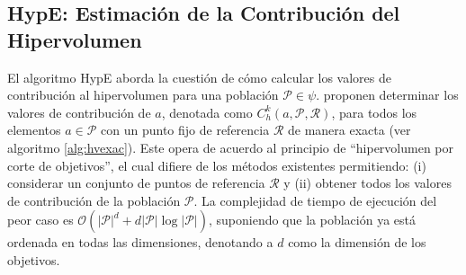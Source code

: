  \subsection{HypE: Estimaci\'on de la Contribuci\'on del Hipervolumen}

  El algoritmo HypE aborda la cuesti\'on de c\'omo calcular los valores de contribuci\'on al hipervolumen 
  para una poblaci\'on $\mathcal{P} \in \psi$.  \cite{Bader11} proponen determinar los valores de contribuci\'on
  de $a$, denotada como $C^k_h\left(a,\mathcal{P},\mathcal{R} \right)$, para todos los elementos \DIFdelbegin {}\DIFdelend $a \in \mathcal{P}$ con 
  un punto fijo de referencia $\mathcal{R}$ de manera exacta (ver algoritmo \ref{alg:hvexac}). Este opera de acuerdo al principio de ``hipervolumen por corte 
  de objetivos'', el cual difiere de los m\'etodos existentes permitiendo: (i) considerar un conjunto de puntos de 
  referencia $\mathcal{R}$ y (ii) obtener todos los valores de contribuci\'on de la poblaci\'on $\mathcal{P}$. La complejidad 
  de tiempo de ejecuci\'on del peor caso es  $\mathcal{O}(|\mathcal{P}|^d + d|\mathcal{P}|\log |\mathcal{P}|)$, suponiendo que 
  la poblaci\'on ya est\'a ordenada en todas las dimensiones, denotando a $d$ como la dimensi\'on de los objetivos. 


